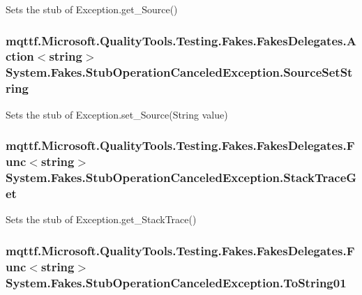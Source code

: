 Sets the stub of Exception.\-get\-\_\-\-Source()

\hypertarget{class_system_1_1_fakes_1_1_stub_operation_canceled_exception_a06f64491456e3d31c1b0da4cbaab3f3c}{
\subsubsection[{Source\-Set\-String}]{\setlength{\rightskip}{0pt plus 5cm}mqttf.\-Microsoft.\-Quality\-Tools.\-Testing.\-Fakes.\-Fakes\-Delegates.\-Action$<$string$>$ System.\-Fakes.\-Stub\-Operation\-Canceled\-Exception.\-Source\-Set\-String}}\label{class_system_1_1_fakes_1_1_stub_operation_canceled_exception_a06f64491456e3d31c1b0da4cbaab3f3c}


Sets the stub of Exception.\-set\-\_\-\-Source(\-String value)

\hypertarget{class_system_1_1_fakes_1_1_stub_operation_canceled_exception_a09c3d0e6e5a18825601d8e0f6ea1a8aa}{
\subsubsection[{Stack\-Trace\-Get}]{\setlength{\rightskip}{0pt plus 5cm}mqttf.\-Microsoft.\-Quality\-Tools.\-Testing.\-Fakes.\-Fakes\-Delegates.\-Func$<$string$>$ System.\-Fakes.\-Stub\-Operation\-Canceled\-Exception.\-Stack\-Trace\-Get}}\label{class_system_1_1_fakes_1_1_stub_operation_canceled_exception_a09c3d0e6e5a18825601d8e0f6ea1a8aa}


Sets the stub of Exception.\-get\-\_\-\-Stack\-Trace()

\hypertarget{class_system_1_1_fakes_1_1_stub_operation_canceled_exception_a9e38e3568e1b4c9ee7c62586711ecce1}{
\subsubsection[{To\-String01}]{\setlength{\rightskip}{0pt plus 5cm}mqttf.\-Microsoft.\-Quality\-Tools.\-Testing.\-Fakes.\-Fakes\-Delegates.\-Func$<$string$>$ System.\-Fakes.\-Stub\-Operation\-Canceled\-Exception.\-To\-String01}}\label{class_system_1_1_fakes_1_1_stub_operation_canceled_exception_a9e38e3568e1b4c9ee7c62586711ecce1}


